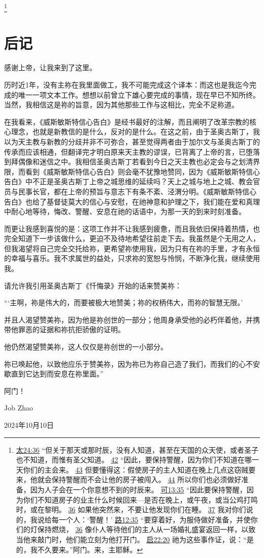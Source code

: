 \documentclass[12pt, a4paper, oneside]{ctexart}
\begin{document}
	\footnote {
		\href{https://biblehub.com/matthew/24-36.htm}{太24:36} “但关于那天或那时辰，没有人知道，甚至在天国的众天使，或者圣子也不知道，而惟有圣父知道。
		\href{https://biblehub.com/matthew/24-42.htm}{42} “因此，要保持警醒，因为你们不知道在哪一天你们的主会来。
		\href{https://biblehub.com/matthew/24-43.htm}{43} 但要懂得这：假使房子的主人知道在晚上几点这窃贼要来，他就会保持警醒而不会让他的房子被闯入。
		\href{https://biblehub.com/matthew/24-44.htm}{44} 所以你们也必须做好准备，因为人子会在一个你意想不到的时辰来。
		\href{https://biblehub.com/mark/13-35.htm}{可13:35} “因此要保持警醒，因为你们不知道房子的业主什么时候回来---是否在晚上，或午夜，或当公鸡打鸣时，或在黎明。
		\href{https://biblehub.com/mark/13-36.htm}{36} 如果他突然来，不要让他发现你们在睡。
		\href{https://biblehub.com/mark/13-37.htm}{37} 我对你们说的，我说给每一个人：‘警醒！’
		\href{https://biblehub.com/luke/12-35.htm}{路12:35} “要穿着好，为服侍做好准备，并使你们的灯保持燃烧，
		\href{https://biblehub.com/luke/12-36.htm}{36} 像仆人等待他们的主人从一场婚礼盛宴返回一样，以致当他来敲门时，他们能立刻为他打开门。
		\href{https://biblehub.com/revelation/22-20.htm}{启22:20} 祂为这些事作证，说：“是的，我不久要来。”阿门。来，主耶稣。
	}
\thispagestyle{empty}
\newpage

\section*{后记}

感谢上帝，让我来到了这里。

历时近1年，没有主祢在我里面做工，我不可能完成这个译本：而这也是我迄今完成的唯一一项文本工作。想想以前曾立下雄心要完成的事情，现在早已不知所终。当然，我相信这是祢的旨意，因为其他那些工作与这相比，完全不足称道。

在我看来，《威斯敏斯特信心告白》是经书最好的注解，而且阐明了改革宗教的核心理念，也就是新教信的是什么，反对的是什么。在这之前，由于圣奥古斯丁，我以为天主教与新教的分歧并非不可弥合，甚至觉得两者由于加尔文与圣奥古斯丁的传承而应该相通，但翻译完才明白原来天主教的谬误，已背离了上帝的言，已堕落到拜偶像和迷信之中。我相信圣奥古斯丁若看到今日之天主教也必定会与之划清界限，而看到《威斯敏斯特信心告白》则会毫不犹豫地赞同，因为《威斯敏斯特信心告白》中不正是圣奥古斯丁上帝之城思维的延续吗？天上之城与地上之城、教会官员与民事长官，都在上帝的预旨与意志下有条不紊、泾渭分明。《威斯敏斯特信心告白》也给了基督徒莫大的信心与安慰，在祂神意和护理之下，我们能在爱和真理中耐心地等待，悔改、警醒、安息在祂的话语中，为那一天的到来时刻准备。

而更让我感到喜悦的是：这项工作并不让我感到疲惫，而且我依旧保持着热情，也完全知道下一步该做什么，更迫不及待地希望往前走下去。我虽然是个无用之人，但我渴望将自己完全交托给祢，更希望祢使用我，因为只有在祢的手里，才有永恒的幸福与喜乐。我不求属世的益处，只求祢的宽恕与怜悯，不断净化我，继续使用我。

请允许我引用圣奥古斯丁《忏悔录》开始的话来赞美祢：

“‘主啊，祢是伟大的，而要被极大地赞美；祢的权柄伟大，而祢的智慧无限。’

并且人渴望赞美祢，因为他是祢创世的一部分；他周身承受他的必朽伴着他，并携带他罪恶的证据和祢抗拒骄傲的证明。

他仍然渴望赞美祢，这人仅仅是祢创世的一小部分。

祢已唤起他，以致他应乐于赞美祢，因为祢已为祢自己造了我们，而我们的心不安歇直到它达到而安息在祢里面。”

阿门！

\hfill Job Zhao

\hfill 2024年10月10日
\end{document}
